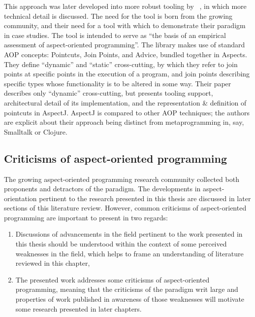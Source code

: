 This approach was later developed into more robust tooling by
\citeauthor{aspectj_intro}~\cite{aspectj_intro}, in which more technical detail
is discussed. The need for the tool is born from the growing community, and
their need for a tool with which to demonstrate their paradigm in case studies.
The tool is intended to serve as ``the basis of an empirical assessment of
aspect-oriented programming''. The library makes use of standard AOP concepts:
Pointcuts, Join Points, and Advice, bundled together in Aspects. They define
``dynamic'' and ``static'' cross-cutting, by which they refer to join points at
specific points in the execution of a program, and join points describing
specific types whose functionality is to be altered in some way. Their paper
describes only ``dynamic'' cross-cutting, but presents tooling support,
architectural detail of its implementation, and the representation \& definition
of pointcuts in AspectJ. AspectJ is compared to other AOP techniques; the
authors are explicit about their approach being distinct from metaprogramming
in, say, Smalltalk or Clojure.

\subsection{Criticisms of aspect-oriented programming}

The growing aspect-oriented programming research community collected both
proponents and detractors of the paradigm. The developments in
aspect-orientation pertinent to the research presented in this thesis are
discussed in later sections of this literature review. However, common
criticisms of aspect-oriented programming are important to present in two
regards:

\begin{enumerate}
    \item Discussions of advancements in the field pertinent to the work
    presented in this thesis should be understood within the context of some
    perceived weaknesses in the field, which helps to frame an understanding of
    literature reviewed in this chapter,
    \item The presented work addresses some criticisms of aspect-oriented
    programming, meaning that the criticisms of the paradigm writ large and
    properties of work published in awareness of those weaknesses will motivate
    some research presented in later chapters.
\end{enumerate}

